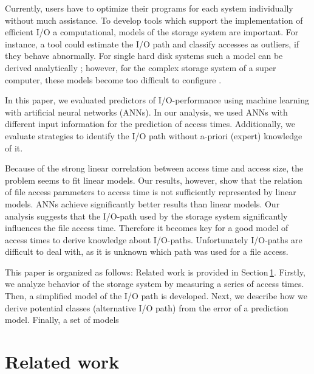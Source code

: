 \documentclass{superfri}
\begin{document}
Currently, users have to optimize their programs for each system individually without much assistance.
To develop tools which support the implementation of efficient I/O a computational, models of the storage system are important.
For instance, a tool could estimate the I/O path and classify accesses as outliers, if they behave abnormally.
For single hard disk systems such a model can be derived analytically \cite{Ruemmler94anintroduction}; however, for the complex storage system of a super computer, these models become too difficult to configure \cite{DBLP:conf/npc/ZhangLZJC10}.

In this paper, we evaluated predictors of I/O-performance using machine learning with artificial neural networks (ANNs).
In our analysis, we used ANNs with different input information for the prediction of access times.
Additionally, we evaluate strategies to identify the I/O path without a-priori (expert) knowledge of it.

Because of the strong linear correlation between access time and access size, the problem seems to fit linear models.
Our results, however, show that the relation of file access parameters to access time is not sufficiently represented by linear models.
ANNs achieve significantly better results than linear models.
Our analysis suggests that the I/O-path used by the storage system significantly influences the file access time.
Therefore it becomes key for a good model of access times to derive knowledge about I/O-paths.
Unfortunately I/O-paths are difficult to deal with, as it is unknown which path was used for a file access.

This paper is organized as follows:
Related work is provided in Section\,\ref{sec:related}.
Firstly, we analyze behavior of the storage system by measuring a series of access times.
Then, a simplified model of the I/O path is developed.
Next, we describe how we derive potential classes (alternative I/O path) from the error of a prediction model.
Finally, a set of models 


\section{Related work}
\label{sec:related}
\end{document}
